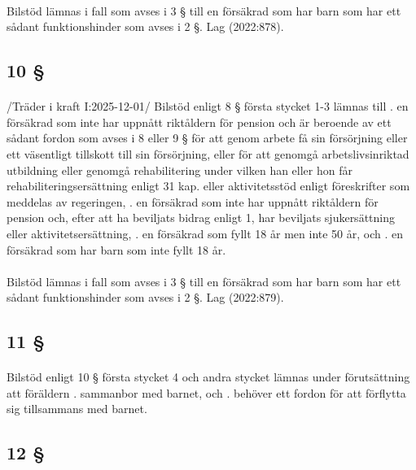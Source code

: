 \documentclass[a4paper,notitlepage,openany,10pt]{book}
\begin{document}
\paragraph*{}
Bilstöd lämnas i fall som avses i 3 § till en försäkrad som har barn som har ett sådant funktionshinder som avses i 2 §.
Lag (2022:878).
\subsection*{10 §}
\paragraph*{}
/Träder i kraft I:2025-12-01/
Bilstöd enligt 8 § första stycket 1-3 lämnas till
. en försäkrad som inte har uppnått riktåldern för pension och är beroende av ett sådant fordon som avses i 8 eller 9 § för att genom arbete få sin försörjning eller ett väsentligt tillskott till sin försörjning, eller för att genomgå arbetslivsinriktad utbildning eller genomgå rehabilitering under vilken han eller hon får rehabiliteringsersättning enligt 31 kap. eller aktivitetsstöd enligt föreskrifter som meddelas av regeringen,
. en försäkrad som inte har uppnått riktåldern för pension och, efter att ha beviljats bidrag enligt 1, har beviljats sjukersättning eller aktivitetsersättning,
. en försäkrad som fyllt 18 år men inte 50 år, och
. en försäkrad som har barn som inte fyllt 18 år.
\paragraph*{}
Bilstöd lämnas i fall som avses i 3 § till en försäkrad som har barn som har ett sådant funktionshinder som avses i 2 §.
Lag (2022:879).
\subsection*{11 §}
\paragraph*{}
Bilstöd enligt 10 § första stycket 4 och andra stycket lämnas under förutsättning att föräldern
. sammanbor med barnet, och
. behöver ett fordon för att förflytta sig tillsammans med barnet.
\subsection*{12 §}
\end{document}
